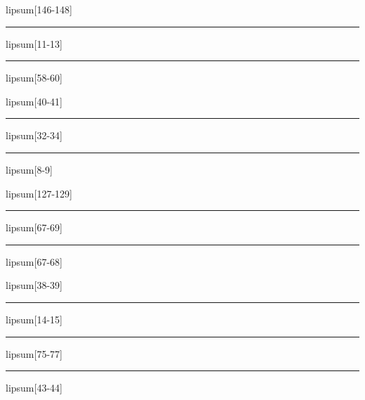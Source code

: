 \documentclass[11pt,a4paper]{article}
\begin{document}
lipsum[146-148]

\begin{simplewrap}
  \textcolor{purple!22}{\rule{3.6cm}{5.1cm}}
\end{simplewrap}
lipsum[11-13]

\begin{simplewrap}
  \textcolor{violet!47}{\rule{3.9cm}{6.5cm}}
\end{simplewrap}
lipsum[58-60]

lipsum[40-41]

\begin{simplewrap}
  \textcolor{teal!29}{\rule{5.9cm}{8.7cm}}
\end{simplewrap}
lipsum[32-34]

\begin{simplewrap}
  \textcolor{violet!36}{\rule{3.5cm}{9.3cm}}
\end{simplewrap}
lipsum[8-9]

lipsum[127-129]

\begin{simplewrap}
  \textcolor{green!48}{\rule{5.2cm}{6.6cm}}
\end{simplewrap}
lipsum[67-69]

\begin{simplewrap}
  \textcolor{red!54}{\rule{5.5cm}{5.0cm}}
\end{simplewrap}
lipsum[67-68]

lipsum[38-39]

\begin{simplewrap}
  \textcolor{brown!39}{\rule{5.6cm}{3.1cm}}
\end{simplewrap}
lipsum[14-15]

\begin{simplewrap}
  \textcolor{olive!50}{\rule{5.7cm}{4.8cm}}
\end{simplewrap}
lipsum[75-77]

\begin{simplewrap}
  \textcolor{green!42}{\rule{3.6cm}{7.0cm}}
\end{simplewrap}
lipsum[43-44]
\end{document}

